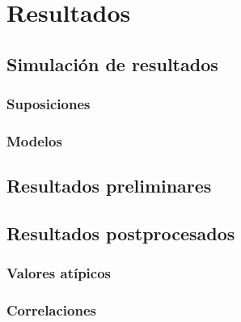\chapter{Resultados}
    \section{Simulación de resultados}
    \subsection{Suposiciones}
    \subsection{Modelos}
    \section{Resultados preliminares}
    \section{Resultados postprocesados}
    \subsection{Valores atípicos}
    \subsection{Correlaciones}
    